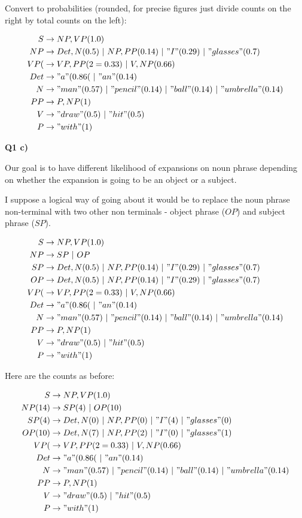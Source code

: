 \documentclass{article}
\newcommand*\OR{\ |\ }
\begin{document}
	Convert to probabilities (rounded, for precise figures just divide counts on the right by total counts on the left):
	
	\begin{align}
		S &\to NP, VP (1.0)\\
		NP  &\to Det, N (0.5) \OR NP, PP (0.14)\OR "I" (0.29)\OR "glasses" (0.7)\\
		VP (&\to VP, PP (2=0.33)\OR V, NP (0.66)\\		
		Det &\to "a" (0.86( \OR "an"(0.14)\\
		N &\to "man" (0.57)\OR "pencil"(0.14) \OR "ball"(0.14) \OR "umbrella"(0.14)\\
		PP &\to P, NP (1)\\
		V &\to "draw" (0.5) \OR "hit"(0.5)\\
		P &\to "with" (1) 
	\end{align}
	
\textbf{Q1 c)}

	Our goal is to have different likelihood of expansions on noun phrase depending on whether the expansion is going to be an object or a subject.

	I suppose a logical way of going about it would be to replace the noun phrase non-terminal with two other non terminals - object phrase ($OP$) and subject phrase ($SP$). 
	
	\begin{align}
		S &\to NP, VP (1.0)\\
		NP &\to SP \OR  OP\\
		SP &\to Det, N (0.5) \OR NP, PP (0.14)\OR "I" (0.29)\OR "glasses" (0.7)\\
		OP &\to Det, N (0.5) \OR NP, PP (0.14)\OR "I" (0.29)\OR "glasses" (0.7)\\
		VP (&\to VP, PP (2=0.33)\OR V, NP (0.66)\\		
		Det &\to "a" (0.86( \OR "an"(0.14)\\
		N &\to "man" (0.57)\OR "pencil"(0.14) \OR "ball"(0.14) \OR "umbrella"(0.14)\\
		PP &\to P, NP (1)\\
		V &\to "draw" (0.5) \OR "hit"(0.5)\\
		P &\to "with" (1) 
	\end{align}
	
	Here are the counts as before:
	
	\begin{align}
		S &\to NP, VP (1.0)\\
		NP (14)&\to SP (4)\OR  OP (10)\\
		SP (4) &\to Det, N (0) \OR NP, PP (0)\OR "I" (4) \OR "glasses" (0)\\
		OP (10)&\to  Det, N (7) \OR NP, PP (2)\OR "I" (0)\OR "glasses" (1)\\
		VP (&\to VP, PP (2=0.33)\OR V, NP (0.66)\\		
		Det &\to "a" (0.86( \OR "an"(0.14)\\
		N &\to "man" (0.57)\OR "pencil"(0.14) \OR "ball"(0.14) \OR "umbrella"(0.14)\\
		PP &\to P, NP (1)\\
		V &\to "draw" (0.5) \OR "hit"(0.5)\\
		P &\to "with" (1) 
	\end{align}
	
\end{document}
